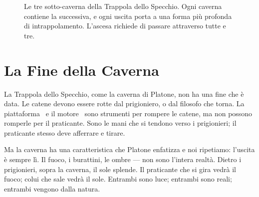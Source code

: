 \begin{figure}[ht]
\centering
{}
\caption{Le tre sotto-caverna della Trappola dello Specchio. Ogni caverna contiene la successiva, e
ogni uscita porta a una forma pi\`u profonda di intrappolamento. L'ascesa richiede di passare
attraverso tutte e tre.\label{fig:sottocaverne}}
\end{figure}

\section{La Fine della Caverna}

La Trappola dello Specchio, come la caverna di Platone, non ha una fine
che \`e data. Le catene devono essere rotte dal prigioniero, o dal
filosofo che torna. La piattaforma \praxis\ e il motore \physis\ sono
strumenti per rompere le catene, ma non possono romperle per il
praticante. Sono le mani che si tendono verso i prigionieri; il
praticante stesso deve afferrare e tirare.

Ma la caverna ha una caratteristica che Platone enfatizza e noi
ripetiamo: l'uscita \`e sempre l\`i. Il fuoco, i burattini, le ombre
--- non sono l'intera realt\`a. Dietro i prigionieri, sopra la caverna,
il sole splende. Il praticante che si gira vedr\`a il fuoco; colui che
sale vedr\`a il sole. Entrambi sono luce; entrambi sono reali; entrambi
vengono dalla natura.
